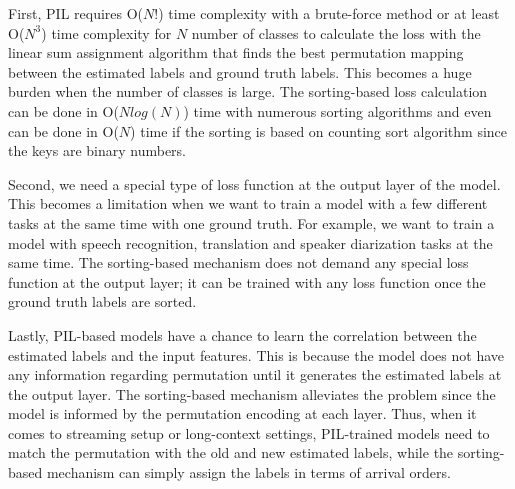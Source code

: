\documentclass{article}
\begin{document}
First, PIL requires O($N!$) time complexity with a brute-force method
or at least O($N^3$) time complexity for $N$ number of classes
to calculate the loss with the linear sum assignment algorithm that finds
the best permutation mapping between the estimated labels and ground truth labels.
This becomes a huge burden when the number of classes is large.
The sorting-based loss calculation can be done in O($Nlog(N)$) time with numerous sorting algorithms and
even can be done in O($N$) time if the sorting is based on counting sort algorithm since the keys are binary numbers.

Second, we need a special type of loss function at the output layer of the model.
This becomes a limitation when we want to train a model with a few different tasks at the same time with one ground truth.
For example, we want to train a model with speech recognition, translation and speaker diarization tasks at the same time.
The sorting-based mechanism does not demand any special loss function at the output layer; it can be trained with any loss function once the
ground truth labels are sorted.

Lastly, PIL-based models have a chance to learn the correlation between the estimated labels and the input features.
This is because the model does not have any information regarding permutation until it generates the estimated labels at the output layer.
The sorting-based mechanism alleviates the problem since the model is informed by the permutation encoding at each layer.
Thus, when it comes to streaming setup or long-context settings, PIL-trained models need to match the permutation with the old and new estimated labels,
while the sorting-based mechanism can simply assign the labels in terms of arrival orders.
\end{document}
